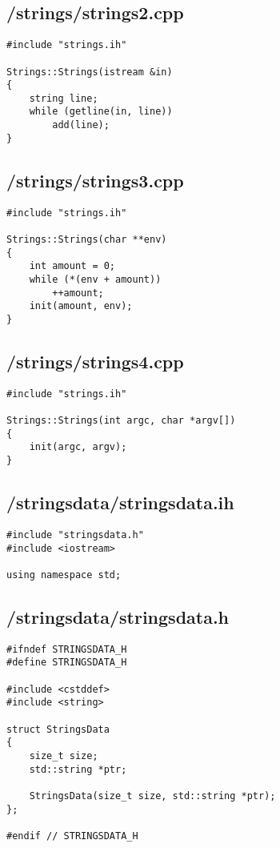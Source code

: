 \documentclass{article}
\begin{document}
\subsection*{/strings/strings2.cpp}
\begin{verbatim}
#include "strings.ih"

Strings::Strings(istream &in)
{
    string line;
    while (getline(in, line))
        add(line);
}

\end{verbatim}
\subsection*{/strings/strings3.cpp}
\begin{verbatim}
#include "strings.ih"

Strings::Strings(char **env)
{
    int amount = 0;
    while (*(env + amount))
        ++amount;
    init(amount, env);
}
\end{verbatim}
\subsection*{/strings/strings4.cpp}
\begin{verbatim}
#include "strings.ih"

Strings::Strings(int argc, char *argv[])
{
    init(argc, argv);
}
\end{verbatim}

\subsection*{/stringsdata/stringsdata.ih}
\begin{verbatim}
#include "stringsdata.h"
#include <iostream>

using namespace std;

\end{verbatim}
\subsection*{/stringsdata/stringsdata.h}
\begin{verbatim}
#ifndef STRINGSDATA_H
#define STRINGSDATA_H

#include <cstddef>
#include <string>

struct StringsData 
{
    size_t size;
    std::string *ptr;

    StringsData(size_t size, std::string *ptr);
};

#endif // STRINGSDATA_H

\end{verbatim}
\end{document}
